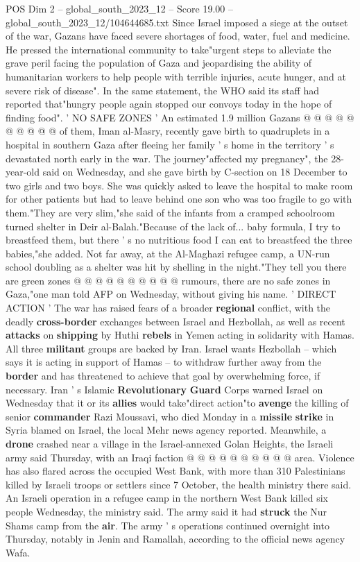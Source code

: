 \begin{textsample}{POS Dim 2 – global\_south\_2023\_12 – Score 19.00 – global\_south\_2023\_12/104644685.txt}
Since Israel imposed a siege at the outset of the war, Gazans have faced severe shortages of food, water, fuel and medicine.
He pressed the international community to take"urgent steps to alleviate the grave peril facing the population of Gaza and jeopardising the ability of humanitarian workers to help people with terrible injuries, acute hunger, and at severe risk of disease".
In the same statement, the WHO said its staff had reported that"hungry people again stopped our convoys today in the hope of finding food". ' NO SAFE ZONES ' An estimated 1.9 million Gazans @ @ @ @ @ @ @ @ @ @ of them, Iman al-Masry, recently gave birth to quadruplets in a hospital in southern Gaza after fleeing her family ' s home in the territory ' s devastated north early in the war.
The journey"affected my pregnancy", the 28-year-old said on Wednesday, and she gave birth by C-section on 18 December to two girls and two boys.
She was quickly asked to leave the hospital to make room for other patients but had to leave behind one son who was too fragile to go with them."They are very slim,"she said of the infants from a cramped schoolroom turned shelter in Deir al-Balah."Because of the lack of... baby formula, I try to breastfeed them, but there ' s no nutritious food I can eat to breastfeed the three babies,"she added.
Not far away, at the Al-Maghazi refugee camp, a UN-run school doubling as a shelter was hit by shelling in the night."They tell you there are green zones @ @ @ @ @ @ @ @ @ @ rumours, there are no safe zones in Gaza,"one man told AFP on Wednesday, without giving his name. ' DIRECT ACTION ' The war has raised fears of a broader \textbf{regional} conflict, with the deadly \textbf{cross-border} exchanges between Israel and Hezbollah, as well as recent \textbf{attacks} on \textbf{shipping} by Huthi \textbf{rebels} in Yemen acting in solidarity with Hamas.
All three \textbf{militant} groups are backed by Iran.
Israel wants Hezbollah -- which says it is acting in support of Hamas -- to withdraw further away from the \textbf{border} and has threatened to achieve that goal by overwhelming force, if necessary.
Iran ' s Islamic \textbf{Revolutionary} \textbf{Guard} Corps warned Israel on Wednesday that it or its \textbf{allies} would take"direct action"to \textbf{avenge} the killing of senior \textbf{commander} Razi Moussavi, who died Monday in a \textbf{missile} \textbf{strike} in Syria blamed on Israel, the local Mehr news agency reported.
Meanwhile, a \textbf{drone} crashed near a village in the Israel-annexed Golan Heights, the Israeli army said Thursday, with an Iraqi faction @ @ @ @ @ @ @ @ @ @ area.
Violence has also flared across the occupied West Bank, with more than 310 Palestinians killed by Israeli troops or settlers since 7 October, the health ministry there said.
An Israeli operation in a refugee camp in the northern West Bank killed six people Wednesday, the ministry said.
The army said it had \textbf{struck} the Nur Shams camp from the \textbf{air}.
The army ' s operations continued overnight into Thursday, notably in Jenin and Ramallah, according to the official news agency Wafa.


\end{textsample}
